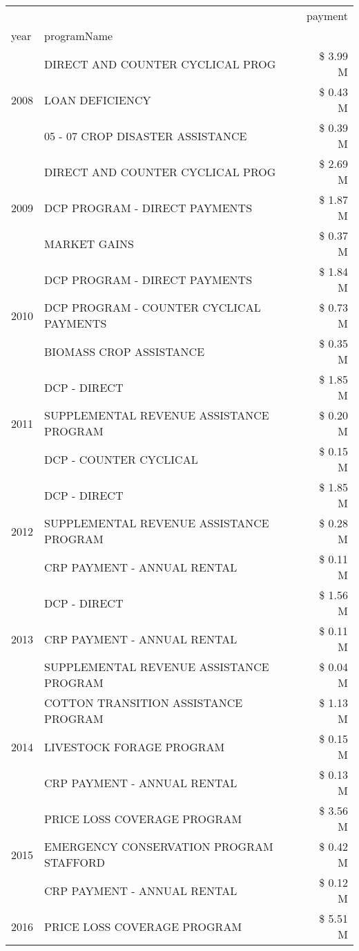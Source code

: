 \begin{tabular}{llr}
\toprule
 &  & payment \\
year & programName &  \\
\midrule
\multirow[t]{3}{*}{2008} & DIRECT AND COUNTER CYCLICAL PROG & \$ 3.99 M \\
 & LOAN DEFICIENCY & \$ 0.43 M \\
 & 05 - 07 CROP DISASTER ASSISTANCE & \$ 0.39 M \\
\cline{1-3}
\multirow[t]{3}{*}{2009} & DIRECT AND COUNTER CYCLICAL PROG & \$ 2.69 M \\
 & DCP PROGRAM - DIRECT PAYMENTS & \$ 1.87 M \\
 & MARKET GAINS & \$ 0.37 M \\
\cline{1-3}
\multirow[t]{3}{*}{2010} & DCP PROGRAM - DIRECT PAYMENTS & \$ 1.84 M \\
 & DCP PROGRAM - COUNTER CYCLICAL PAYMENTS & \$ 0.73 M \\
 & BIOMASS CROP ASSISTANCE & \$ 0.35 M \\
\cline{1-3}
\multirow[t]{3}{*}{2011} & DCP - DIRECT & \$ 1.85 M \\
 & SUPPLEMENTAL REVENUE ASSISTANCE PROGRAM & \$ 0.20 M \\
 & DCP - COUNTER CYCLICAL & \$ 0.15 M \\
\cline{1-3}
\multirow[t]{3}{*}{2012} & DCP - DIRECT & \$ 1.85 M \\
 & SUPPLEMENTAL REVENUE ASSISTANCE PROGRAM & \$ 0.28 M \\
 & CRP PAYMENT - ANNUAL RENTAL & \$ 0.11 M \\
\cline{1-3}
\multirow[t]{3}{*}{2013} & DCP - DIRECT & \$ 1.56 M \\
 & CRP PAYMENT - ANNUAL RENTAL & \$ 0.11 M \\
 & SUPPLEMENTAL REVENUE ASSISTANCE PROGRAM & \$ 0.04 M \\
\cline{1-3}
\multirow[t]{3}{*}{2014} & COTTON TRANSITION ASSISTANCE PROGRAM & \$ 1.13 M \\
 & LIVESTOCK FORAGE PROGRAM & \$ 0.15 M \\
 & CRP PAYMENT - ANNUAL RENTAL & \$ 0.13 M \\
\cline{1-3}
\multirow[t]{3}{*}{2015} & PRICE LOSS COVERAGE PROGRAM & \$ 3.56 M \\
 & EMERGENCY CONSERVATION PROGRAM STAFFORD & \$ 0.42 M \\
 & CRP PAYMENT - ANNUAL RENTAL & \$ 0.12 M \\
\cline{1-3}
\multirow[t]{3}{*}{2016} & PRICE LOSS COVERAGE PROGRAM                   & \$ 5.51 M \\

\end{tabular}
